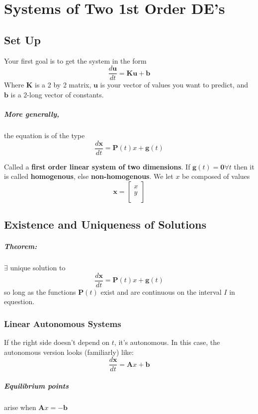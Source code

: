 \documentclass[a4paper,12pt]{report}
\begin{document}
\chapter{Systems of Two 1st Order DE's}
\section{Set Up}
Your first goal is to get the system in the form $$\frac{d \pmb{u}}{dt} = \pmb{Ku + b}$$
Where $\pmb{K}$ is a 2 by 2 matrix, $\pmb{u}$ is your vector of values you want to 
predict, and $\pmb{b}$ is a $2$-long vector of constants.

\paragraph{More generally, } the equation is of the type 
$$\frac{d\pmb{x}}{dt} = \pmb{P}(t)x + \pmb{g}(t)$$

Called a \textbf{first order linear system of two dimensions}. If $\pmb{g}(t) = \pmb{0} \forall t$ 
then it is called \textbf{homogenous}, else \textbf{non-homogenous}. We let $x$ be composed
of values $$\pmb{x} = \begin{bmatrix}
                           x \\
                           y \\
                      \end{bmatrix}$$

\section{Existence and Uniqueness of Solutions}
\paragraph{Theorem: } $\exists$ unique solution to $$\frac{d\pmb{x}}{dt} = \pmb{P}(t)x + \pmb{g}(t)$$ 
so long as the functions $\pmb{P}(t)$ exist and are continuous on the interval $I$ in equestion.

\subsection{Linear Autonomous Systems}
If the right side doesn't depend on $t$, it's autonomous. In this case, the autonomous 
version looks (familiarly) like: $$\frac{d\pmb{x}}{dt} = \pmb{A}x + \pmb{b}$$

\paragraph{Equilibrium points} arise when $\pmb{A}x = -\pmb{b}$
\end{document}
